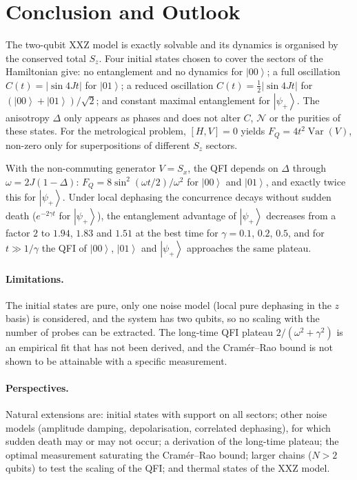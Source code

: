 \documentclass[11pt,a4paper]{article}
\newcommand{\ket}[1]{\left|#1\right\rangle}
\newcommand{\Var}{\operatorname{Var}}
\newcommand{\FQ}{F_Q}
\begin{document}
\section{Conclusion and Outlook}\label{sec:conclusion}

The two-qubit XXZ model is exactly solvable and its dynamics is organised by the conserved total $S_z$. Four initial states chosen to cover the sectors of the Hamiltonian give: no entanglement and no dynamics for $\ket{00}$; a full oscillation $C(t)=\lvert\sin4Jt\rvert$ for $\ket{01}$; a reduced oscillation $C(t)=\tfrac12\lvert\sin4Jt\rvert$ for $(\ket{00}+\ket{01})/\sqrt2$; and constant maximal entanglement for $\ket{\psi_+}$. The anisotropy $\Delta$ only appears as phases and does not alter $C$, $\mathcal N$ or the purities of these states. For the metrological problem, $[H,V]=0$ yields $\FQ=4t^2\Var(V)$, non-zero only for superpositions of different $S_z$ sectors.

With the non-commuting generator $V=S_x$, the QFI depends on $\Delta$ through $\omega=2J(1-\Delta)$: $\FQ=8\sin^2(\omega t/2)/\omega^2$ for $\ket{00}$ and $\ket{01}$, and exactly twice this for $\ket{\psi_+}$. Under local dephasing the concurrence decays without sudden death ($e^{-2\gamma t}$ for $\ket{\psi_+}$), the entanglement advantage of $\ket{\psi_+}$ decreases from a factor $2$ to $1.94$, $1.83$ and $1.51$ at the best time for $\gamma=0.1$, $0.2$, $0.5$, and for $t\gg1/\gamma$ the QFI of $\ket{00}$, $\ket{01}$ and $\ket{\psi_+}$ approaches the same plateau.

\paragraph{Limitations.} The initial states are pure, only one noise model (local pure dephasing in the $z$ basis) is considered, and the system has two qubits, so no scaling with the number of probes can be extracted. The long-time QFI plateau $2/(\omega^2+\gamma^2)$ is an empirical fit that has not been derived, and the Cram\'er--Rao bound is not shown to be attainable with a specific measurement.

\paragraph{Perspectives.} Natural extensions are: initial states with support on all sectors; other noise models (amplitude damping, depolarisation, correlated dephasing), for which sudden death may or may not occur; a derivation of the long-time plateau; the optimal measurement saturating the Cram\'er--Rao bound; larger chains ($N>2$ qubits) to test the scaling of the QFI; and thermal states of the XXZ model.
\end{document}
